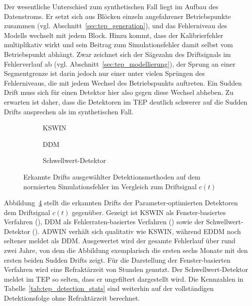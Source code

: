 %
Der wesentliche Unterschied zum synthetischen Fall liegt im Aufbau des Datenstroms. Er setzt sich aus Blöcken einzeln angefahrener Betriebspunkte zusammen (vgl. Abschnitt~\ref{sec:tep_generation}), und das Fehlerniveau des Modells wechselt mit jedem Block. Hinzu kommt, dass der Kalibrierfehler multiplikativ wirkt und sein Beitrag zum Simulationsfehler damit selbst vom Betriebspunkt abhängt. Zwar zeichnet sich der Sägezahn des Driftsignals im Fehlerverlauf ab (vgl. Abschnitt~\ref{sec:tep_modellierung}), der Sprung an einer Segmentgrenze ist darin jedoch nur einer unter vielen Sprüngen des Fehlerniveaus, die mit jedem Wechsel des Betriebspunkts auftreten. Ein Sudden Drift muss sich für einen Detektor hier also gegen diese Wechsel abheben. Zu erwarten ist daher, dass die Detektoren im \ac{TEP} deutlich schwerer auf die Sudden Drifts ansprechen als im synthetischen Fall. \par
%
\begin{figure}[tbp]
    \centering
    \begin{subfigure}[t]{\textwidth}
        \centering
        
        \caption{\ac{KSWIN}}
        \label{fig:tep_detection_kswin}
    \end{subfigure}

    \begin{subfigure}[t]{\textwidth}
        \centering
        
        \caption{\ac{DDM}}
        \label{fig:tep_detection_ddm}
    \end{subfigure}

    \begin{subfigure}[t]{\textwidth}
        \centering
        
        \caption{Schwellwert-Detektor}
        \label{fig:tep_detection_rmse}
    \end{subfigure}
    \caption{Erkannte Drifts ausgewählter Detektionsmethoden auf dem normierten Simulationsfehler im Vergleich zum Driftsignal $c(t)$}
    \label{fig:tep_detection_comparison}
\end{figure}
%
Abbildung~\ref{fig:tep_detection_comparison} stellt die erkannten Drifts der Parameter-optimierten Detektoren dem Driftsignal $c(t)$ gegenüber. Gezeigt ist \ac{KSWIN} als Fenster-basiertes Verfahren (), \ac{DDM} als Fehlerraten-basiertes Verfahren () sowie der Schwellwert-Detektor (). \ac{ADWIN} verhält sich qualitativ wie \ac{KSWIN}, während \ac{EDDM} noch seltener meldet als \ac{DDM}. Ausgewertet wird der gesamte Fehlerlauf über rund zwei Jahre, von dem die Abbildung exemplarisch die ersten sechs Monate mit den ersten beiden Sudden Drifts zeigt. Für die Darstellung der Fenster-basierten Verfahren wird eine Refraktärzeit von \tepdriftCooldownH{} Stunden genutzt. Der Schwellwert-Detektor meldet im \ac{TEP} so selten, dass er ungefiltert dargestellt wird. Die Kennzahlen in Tabelle~\ref{tab:tep_detection_stats} sind weiterhin auf der vollständigen Detektionsfolge ohne Refraktärzeit berechnet. \par

